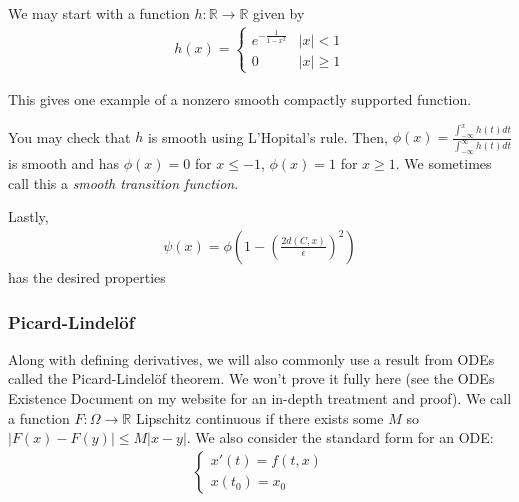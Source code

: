 \documentclass{article}
\newcommand{\R}{{\mathbb{R}}}
\newcommand{\cl}[1]{{\overline{#1}}}
\newcounter{result}[section]
\begin{document}
	We may start with a function $h: \R \to \R$ given by 
	\begin{align*}
		h(x) = \begin{cases}
			e^{-\frac{1}{1-x^{2}}} & |x| < 1 \\
			0 & |x| \geq 1
		\end{cases}
	\end{align*}
	
	This gives one example of a nonzero smooth compactly supported function. 
	
	You may check that $h$ is smooth using L'Hopital's rule. Then, $\phi(x) = \frac{\int_{-\infty}^{x} h(t)dt}{\int_{-\infty}^{\infty} h(t)dt}$ is smooth and has $\phi(x) = 0$ for $x \leq -1$, $\phi(x) = 1$ for $x \geq 1$. We sometimes call this a \textit{smooth transition function}. 
	
	Lastly, 
	\begin{align*}
		\psi(x) = \phi(1- (\frac{2d(C,x)}{\epsilon})^{2})
	\end{align*}
	has the desired properties
	
%	
%	
	
	
	\vspace{0.25 cm}
	
	\subsubsection{Picard-Lindel{\"o}f}
	
	Along with defining derivatives, we will also commonly use a result from ODEs called the Picard-Lindel{\"o}f theorem. We won't prove it fully here (see the ODEs Existence Document on my website for an in-depth treatment and proof). We call a function $F: \Omega \to \R$ Lipschitz continuous if there exists some $M$ so $|F(x)-F(y)| \leq M|x-y|$. We also consider the standard form for an ODE:
\begin{align*}
	\begin{cases}
		x'(t) = f(t,x) \\
		x(t_0) = x_0
	\end{cases}
\end{align*}
	
\end{document}
